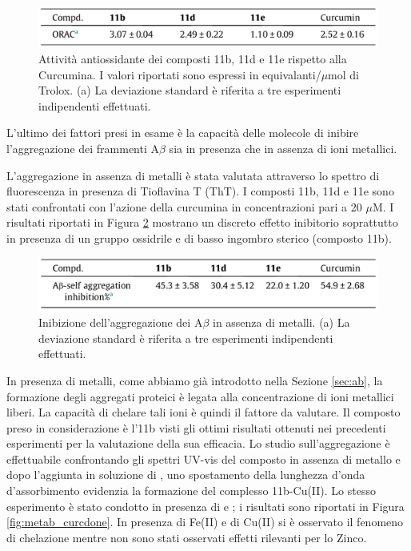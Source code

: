 \documentclass[a4paper, 12pt]{article}
\begin{document}
\begin{figure}[H]
	\centering
	\includegraphics[width=\linewidth]{immagini/roi_curcdone.png}
	\caption{Attività antiossidante dei composti 11b, 11d e 11e rispetto alla Curcumina. I valori riportati sono espressi in equivalanti/$\mu$mol di Trolox. (a) La deviazione standard è riferita a tre esperimenti indipendenti effettuati.}
	\label{fig:roi_curcdone}
\end{figure}


L'ultimo dei fattori presi in esame è la capacità delle molecole di inibire l'aggregazione dei frammenti A$\beta$ sia in presenza che in assenza di ioni metallici.

L'aggregazione in assenza di metalli è stata valutata attraverso lo spettro di fluorescenza in presenza di Tioflavina T (ThT). I composti 11b, 11d e 11e sono stati confrontati con l'azione della curcumina in concentrazioni pari a 20 $\mu$M. I risultati riportati in Figura \ref{fig:selfab_curcdone} mostrano un discreto effetto inibitorio soprattutto in presenza di un gruppo ossidrile e di basso ingombro sterico (composto 11b).

\begin{figure}[H]
	\centering
	\includegraphics[width=\linewidth]{immagini/selfab_curcdone.png}
	\caption{Inibizione dell'aggregazione dei A$\beta$ in assenza di metalli. (a) La deviazione standard è riferita a tre esperimenti indipendenti effettuati.}
	\label{fig:selfab_curcdone}
\end{figure}

In presenza di metalli, come abbiamo già introdotto nella Sezione \ref{sec:ab}, la formazione degli aggregati proteici è legata alla concentrazione di ioni metallici liberi. La capacità di chelare tali ioni è quindi il fattore da valutare. Il composto preso in considerazione è l'11b visti gli ottimi risultati ottenuti nei precedenti esperimenti per la valutazione della sua efficacia. Lo studio sull'aggregazione è effettuabile confrontando gli spettri UV-vis del composto in assenza di metallo e dopo l'aggiunta in soluzione di , uno spostamento della lunghezza d'onda d'assorbimento evidenzia la formazione del complesso 11b-Cu(II). Lo stesso esperimento è stato condotto in presenza di  e ; i risultati sono riportati in Figura \ref{fig:metab_curcdone}. In presenza di Fe(II) e di Cu(II) si è osservato il fenomeno di chelazione mentre non sono stati osservati effetti rilevanti per lo Zinco. \cite{jun_yan_design_2017}
\end{document}
